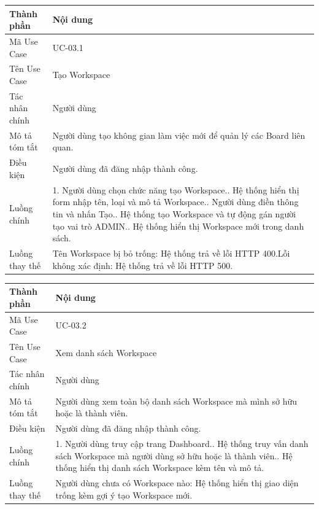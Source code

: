 \vspace{0.3cm}
\noindent\begin{tabular}{|p{3.5cm}|p{10.5cm}|}
\hline
\textbf{Thành phần} & \textbf{Nội dung} \\
\hline
Mã Use Case & UC-03.1 \\
\hline
Tên Use Case & Tạo Workspace \\
\hline
Tác nhân chính & Người dùng \\
\hline
Mô tả tóm tắt & Người dùng tạo không gian làm việc mới để quản lý các Board liên quan. \\
\hline
Điều kiện & Người dùng đã đăng nhập thành công. \\
\hline
Luồng chính & 1. Người dùng chọn chức năng tạo Workspace.\newline 2. Hệ thống hiển thị form nhập tên, loại và mô tả Workspace.\newline 3. Người dùng điền thông tin và nhấn Tạo.\newline 4. Hệ thống tạo Workspace và tự động gán người tạo vai trò ADMIN.\newline 5. Hệ thống hiển thị Workspace mới trong danh sách. \\
\hline
Luồng thay thế & Tên Workspace bị bỏ trống: Hệ thống trả về lỗi HTTP 400.\newline Lỗi không xác định: Hệ thống trả về lỗi HTTP 500. \\
\hline
\end{tabular}

\vspace{0.5cm}
\noindent\begin{tabular}{|p{3.5cm}|p{10.5cm}|}
\hline
\textbf{Thành phần} & \textbf{Nội dung} \\
\hline
Mã Use Case & UC-03.2 \\
\hline
Tên Use Case & Xem danh sách Workspace \\
\hline
Tác nhân chính & Người dùng \\
\hline
Mô tả tóm tắt & Người dùng xem toàn bộ danh sách Workspace mà mình sở hữu hoặc là thành viên. \\
\hline
Điều kiện & Người dùng đã đăng nhập thành công. \\
\hline
Luồng chính & 1. Người dùng truy cập trang Dashboard.\newline 2. Hệ thống truy vấn danh sách Workspace mà người dùng sở hữu hoặc là thành viên.\newline 3. Hệ thống hiển thị danh sách Workspace kèm tên và mô tả. \\
\hline
Luồng thay thế & Người dùng chưa có Workspace nào: Hệ thống hiển thị giao diện trống kèm gợi ý tạo Workspace mới. \\
\hline
\end{tabular}

